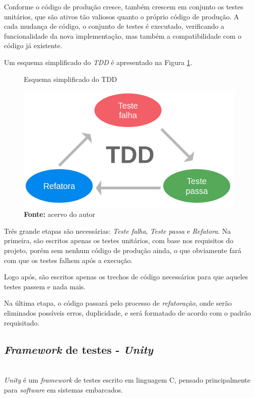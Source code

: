 \documentclass[times, twoside, watermark]{artigo}
\begin{document}
Conforme o código de produção cresce, também crescem em conjunto os testes unitários,
que são ativos tão valiosos quanto o próprio código de produção.
A cada mudança de código, o conjunto de testes é executado, verificando a
funcionalidade da nova implementação, mas também a compatibilidade com o código já
existente\cite{tddembeddedc}.

Um esquema simplificado do \textit{TDD} é apresentado na Figura \ref{fig:tdd}.\hfill\

\begin{figure}[H]
  \centering
  \caption{Esquema simplificado do TDD}
  \includegraphics[width=0.95\linewidth]{images/tdd.png}
  \caption*{\newline\textbf{Fonte:} acervo do autor}
  \label{fig:tdd}
\end{figure}

Três grande etapas são necessárias: \textit{Teste falha}, \textit{Teste passa}
e \textit{Refatora}. Na primeira, são escritos apenas os testes unitários, com base
nos requisitos do projeto, porém sem nenhum código de produção ainda, o que
obviamente fará com que os testes falhem após a execução.

Logo após, são escritos apenas os trechos de código necessários para que aqueles
testes passem e nada mais.

Na última etapa, o código passará pelo processo de \textit{refatoração}, onde serão
eliminados possíveis erros, duplicidade, e será formatado de acordo com o padrão
requisitado.


\subsection{\textit{Framework} de testes - \textit{Unity}}\hfill\\

\textit{Unity} é um \textit{framework} de testes escrito em linguagem C, pensado
principalmente para \textit{software} em sistemas embarcados.
\end{document}
